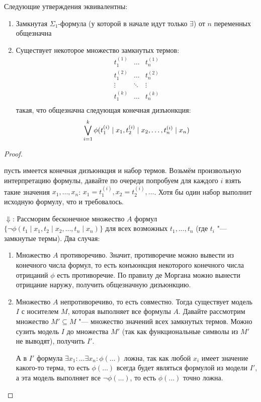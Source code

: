 \begin{theorem}[Эрбрана]
	Следующие утверждения эквивалентны:
	\begin{enumerate}
		\item
			Замкнутая $\Sigma_1$-формула (у которой в начале идут только $\exists$) от $n$ переменных общезначна
		\item
			Существует некоторое множество замкнутых термов:
			\[
			\begin{array}{ccc}
			t_1^{(1)} & \dots & t_n^{(1)} \\
			t_1^{(2)} & \dots & t_n^{(2)} \\
			\vdots & \ddots & \vdots \\
			t_1^{(k)} & \dots & t_n^{(k)} \\
			\end{array}
			\]
			такая, что общезначна следующая конечная дизъюнкция:
			\[
				\bigvee_{i=1}^k
					\phi(t_1^{(i)}\mid x_1, t_2^{(i)} \mid x_2, \dots, t_n^{(i)} \mid x_n)
			\]
	\end{enumerate}
\end{theorem}
\begin{proof}
	\begin{description}
		\item[$\Uparrow$:]
			пусть имеется конечная дизъюнкция и набор термов.
			Возьмём произвольную интерпретацию формулы, давайте по очереди попробуем
			для каждого $i$ взять такие значения $x_1, \dots, x_n$:
			$x_1=t_1^{(i)}, x_2=t_2^{(i)}, \dots$.
			Хотя бы один набор выполнит исходную формулу, что и требовалось.
		\item{$\Downarrow$:}
			Рассморим бесконечное множество $A$ формул $\{ \lnot \phi(t_1 \mid x_1, t_2 \mid x_2, \dots, t_n \mid x_n) \}$
			для всех возможных $t_1, \dots, t_n$ (где $t_i$ "--- замкнутые термы).
			Два случая:
			\begin{enumerate}
				\item
					Множество $A$ противоречиво.
					Значит, противоречие можно вывести из конечного числа формул,
					то есть конъюнкция некоторого конечного числа отрицаний $\phi$ есть противоречие.
					По правилу де Моргана можно вынести отрицание наружу, получить общезначную дизъюнкцию.
				\item
					Множество $A$ непротиворечиво, то есть совместно.
					Тогда существует модель $I$ с носителем $M$, которая выполняет все формулы $A$.
					Давайте рассмотрим множество $M' \subseteq M$ "--- множество значений всех
					замкнутых термов.
					Можно сузить модель $I$ до множества $M'$ (так как функциональные символы из $M'$
					не выводят), получить $I'$.

					А в $I'$ формула $\exists x_1 \colon \dots \exists x_n \colon \phi(\dots)$ ложна,
					так как любой $x_i$ имеет значение какого-то терма, то есть $\phi(\dots)$ всегда
					будет являться формулой из модели $I'$, а эта модель выполняет все $\lnot \phi(\dots)$,
					то есть $\phi(\dots)$ точно ложна.
			\end{enumerate}
	\end{description}
\end{proof}

